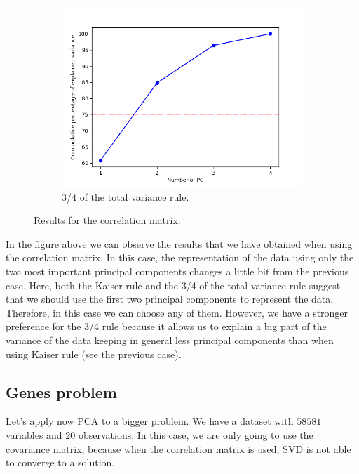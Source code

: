 \documentclass[11pt,a4paper]{article}
\begin{document}
\begin{figure}[H]
\begin{subfigure}[t]{.5\textwidth}
    \includegraphics[scale=0.4]{img/pc_correlation_variance}
    \caption{3/4 of the total variance rule.}
  \end{subfigure}
  \caption{Results for the correlation matrix.}
  \label{fig:pc-correlation}
\end{figure}

In the figure above we can observe the results that we have obtained when using the correlation matrix. In
this case, the representation of the data using only the two most important principal components changes a
little bit from the previous case. Here, both the Kaiser rule and the 3/4 of the total variance rule suggest
that we should use the first two principal components to represent the data. Therefore, in this case we can choose
any of them. However, we have a stronger preference for the 3/4 rule because it allows us to explain a big part
of the variance of the data keeping in general less principal components than when using Kaiser rule (see the
previous case).

\subsection{Genes problem}

Let's apply now PCA to a bigger problem. We have a dataset with $58581$ variables and 20 observations.
In this case, we are only going to use the covariance matrix, because when the correlation matrix is used,
SVD is not able to converge to a solution.
\end{document}
